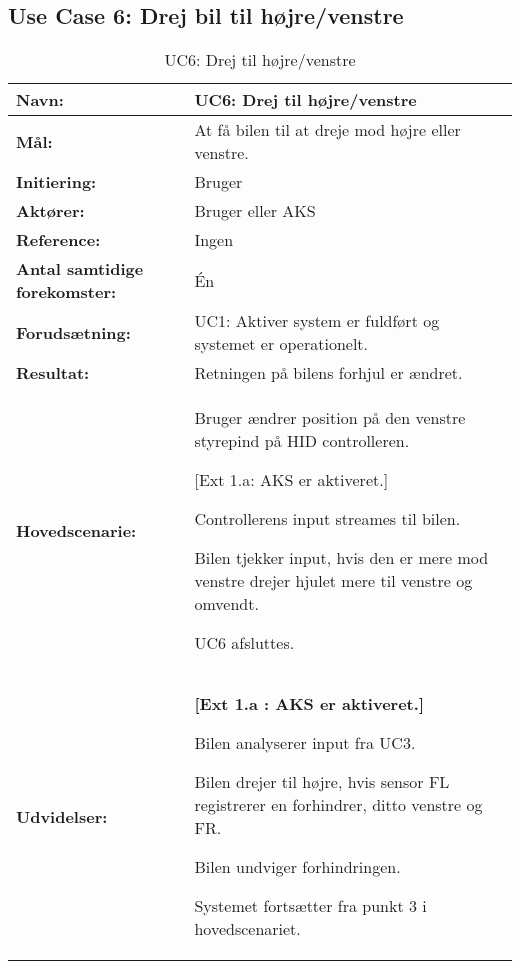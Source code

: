\subsection{Use Case 6: Drej bil til højre/venstre}
\begin{table}[h]
\begin{tabularx}{\textwidth}{| L{3.3 cm} | Z |} \hline

\textbf{Navn:} 						& UC6: Drej til højre/venstre\\ \hline
\textbf{Mål:}						& At få bilen til at dreje mod højre eller venstre. \\ \hline
\textbf{Initiering:}				& Bruger \\ \hline
\textbf{Aktører:} 					& Bruger eller AKS \\ \hline
\textbf{Reference:} 				& Ingen\\ \hline
\textbf{Antal samtidige forekomster:} & Én \\ \hline
\textbf{Forudsætning:} 				& UC1: Aktiver system er fuldført og systemet er operationelt. \\ \hline
\textbf{Resultat:}					& Retningen på bilens forhjul er ændret. \\ \hline
\textbf{Hovedscenarie:}				& 

\begin{packed_enum}
\item Bruger ændrer position på den venstre styrepind på HID controlleren.
	\begin{packed_item}\itemsep1pt \parskip0pt 
	\item {[}Ext 1.a: AKS er aktiveret.{]}
	\end{packed_item}
\item Controllerens input streames til bilen.
\item Bilen tjekker input, hvis den er mere mod venstre drejer hjulet mere til venstre og omvendt. %
\item UC6 afsluttes.
\end{packed_enum} \\ \hline
\textbf{Udvidelser:}				&  
\textbf{{[}Ext 1.a : AKS er aktiveret.{]}}
	\begin{packed_enum}\itemsep1pt \parskip0pt 
		\item Bilen analyserer input fra UC3.
		\item Bilen drejer til højre, hvis sensor FL registrerer en forhindrer, ditto venstre og FR.
		\item Bilen undviger forhindringen. %
		\item Systemet fortsætter fra punkt 3 i hovedscenariet.
	\end{packed_enum}
\\ \hline
\end{tabularx}
\caption{UC6: Drej til højre/venstre}
\label{tbl:UC6}
\end{table}
